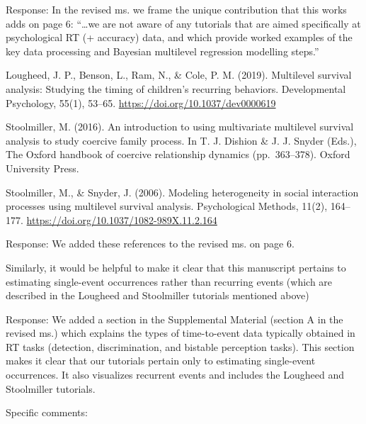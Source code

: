 \documentclass[
]{article}
\renewenvironment{quote}{\begin{leftbar}}{\end{leftbar}}
\begin{document}
Response: In the revised ms. we frame the unique contribution that this
works adds on page 6: ``\ldots we are not aware of any tutorials that
are aimed specifically at psychological RT (+ accuracy) data, and which
provide worked examples of the key data processing and Bayesian
multilevel regression modelling steps.''

\begin{quote}
Lougheed, J. P., Benson, L., Ram, N., \& Cole, P. M. (2019). Multilevel
survival analysis: Studying the timing of children's recurring
behaviors. Developmental Psychology, 55(1), 53--65.
\url{https://doi.org/10.1037/dev0000619}
\end{quote}

\begin{quote}
Stoolmiller, M. (2016). An introduction to using multivariate multilevel
survival analysis to study coercive family process. In T. J. Dishion \&
J. J. Snyder (Eds.), The Oxford handbook of coercive relationship
dynamics (pp.~363--378). Oxford University Press.
\end{quote}

\begin{quote}
Stoolmiller, M., \& Snyder, J. (2006). Modeling heterogeneity in social
interaction processes using multilevel survival analysis. Psychological
Methods, 11(2), 164--177.
\url{https://doi.org/10.1037/1082-989X.11.2.164}
\end{quote}

Response: We added these references to the revised ms. on page 6.

\begin{quote}
Similarly, it would be helpful to make it clear that this manuscript
pertains to estimating single-event occurrences rather than recurring
events (which are described in the Lougheed and Stoolmiller tutorials
mentioned above)
\end{quote}

Response: We added a section in the Supplemental Material (section A in
the revised ms.) which explains the types of time-to-event data
typically obtained in RT tasks (detection, discrimination, and bistable
perception tasks). This section makes it clear that our tutorials
pertain only to estimating single-event occurrences. It also visualizes
recurrent events and includes the Lougheed and Stoolmiller tutorials.

\begin{quote}
Specific comments:
\end{quote}
\end{document}
